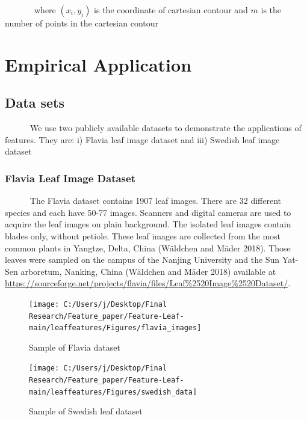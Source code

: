 \documentclass{article}
\begin{document}
~~~~~~~where \((x_i,y_i)\) is the coordinate of cartesian contour and
\(m\) is the number of points in the cartesian contour

\hypertarget{empirical-application}{%
\section{Empirical Application}\label{empirical-application}}

\hypertarget{data-sets}{%
\subsection{Data sets}\label{data-sets}}

~~~~~~We use two publicly available datasets to demonstrate the
applications of features. They are: i) Flavia leaf image dataset and
iii) Swedish leaf image dataset

\hypertarget{flavia-leaf-image-dataset}{%
\subsubsection{Flavia Leaf Image
Dataset}\label{flavia-leaf-image-dataset}}

~~~~~~The Flavia dataset contains 1907 leaf images. There are 32
different species and each have 50-77 images. Scanners and digital
cameras are used to acquire the leaf images on plain background. The
isolated leaf images contain blades only, without petiole. These leaf
images are collected from the most common plants in Yangtze, Delta,
China (Wäldchen and Mäder 2018). Those leaves were sampled on the campus
of the Nanjing University and the Sun Yat-Sen arboretum, Nanking, China
(Wäldchen and Mäder 2018) available at
\url{https://sourceforge.net/projects/flavia/files/Leaf%2520Image%2520Dataset/}.

\begin{figure}[!ht]

{\centering \texttt{[image: C:/Users/j/Desktop/Final Research/Feature\_paper/Feature-Leaf-main/leaffeatures/Figures/flavia\_images]} 

}

\caption{\label{slp1}Sample of Flavia dataset}\label{fig:unnamed-chunk-35}
\end{figure}

\begin{figure}[!ht]

{\centering \texttt{[image: C:/Users/j/Desktop/Final Research/Feature\_paper/Feature-Leaf-main/leaffeatures/Figures/swedish\_data]} 

}

\caption{\label{slp2}Sample of Swedish leaf dataset}\label{fig:unnamed-chunk-36}
\end{figure}
\end{document}
